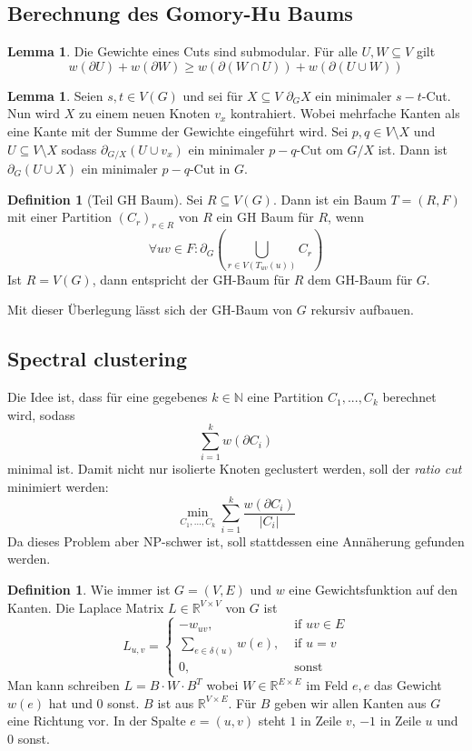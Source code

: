\documentclass[a4paper, 12pt]{article}
\theoremstyle{plain}
\theoremstyle{definition}
\newtheorem{definition}[theorem]{Definition} %
\theoremstyle{lemma}
\newtheorem{lemma}[theorem]{Lemma}
\theoremstyle{remark}
\theoremstyle{corollary}
\theoremstyle{example}
\begin{document}
	\subsection{Berechnung des Gomory-Hu Baums}
	\begin{lemma}
		Die Gewichte eines Cuts sind submodular. Für alle $U,W\subseteq V$ gilt \[w(\partial U) + w(\partial W) \geq w(\partial (W\cap U)) + w(\partial (U \cup W))\]
	\end{lemma}
	\begin{lemma}
		Seien $s,t \in V(G)$ und sei für $X\subseteq V$ $\partial_G X$ ein minimaler $s-t$-Cut. Nun wird $X$ zu einem neuen Knoten $v_x$ kontrahiert. Wobei mehrfache Kanten als eine Kante mit der Summe der Gewichte eingeführt wird. Sei $p,q \in V\setminus X$ und $U\subseteq V\setminus X$ sodass $\partial_{G/X}(U\cup v_x)$ ein minimaler $p-q$-Cut om $G/X$ ist. Dann ist $\partial_G(U\cup X)$ ein minimaler $p-q$-Cut in $G$.
	\end{lemma}
	\begin{definition}[Teil GH Baum]
		Sei $R\subseteq V(G)$. Dann ist ein Baum $T = (R,F)$ mit einer Partition $(C_r)_{r\in R}$ von $R$ ein GH Baum für $R$, wenn \[\forall uv \in F: \partial_G \left(\bigcup_{r \in V(T_{uv}(u))} C_r\right)\] Ist $R=V(G)$, dann entspricht der GH-Baum für $R$ dem GH-Baum für $G$.
	\end{definition}
	Mit dieser Überlegung lässt sich der GH-Baum von $G$ rekursiv aufbauen.
	\subsection{Spectral clustering}
	Die Idee ist, dass für eine gegebenes $k \in \mathbb{N}$ eine Partition $C_1,...,C_k$ berechnet wird, sodass \[\sum_{i=1}^{k} w(\partial C_i)\] minimal ist. Damit nicht nur isolierte Knoten geclustert werden, soll der \textit{ratio cut} minimiert werden: \[\min_{C_1,...,C_k} \sum_{i=1}^k \frac{w(\partial C_i)}{\left|C_i\right|}\] Da dieses Problem aber NP-schwer ist, soll stattdessen eine Annäherung gefunden werden.
	\begin{definition}
		Wie immer ist $G=(V,E)$ und $w$ eine Gewichtsfunktion auf den Kanten. Die Laplace Matrix $L \in \mathbb{R}^{V\times V}$ von $G$ ist \[L_{u,v} = \begin{cases}
			-w_{uv}, & \text{ if } uv \in E\\
			\sum_{e \in \delta(u)} w(e), & \text{ if } u=v\\
			0, & \text{ sonst}
		\end{cases}\]
		Man kann schreiben $L = B\cdot W \cdot B^T$ wobei $W \in \mathbb{R}^{E \times E}$ im Feld $e,e$ das Gewicht $w(e)$ hat und 0 sonst. $B$ ist aus $\mathbb{R}^{V \times E}$. Für $B$ geben wir allen Kanten aus $G$ eine Richtung vor. In der Spalte $e = (u,v)$ steht $1$ in Zeile $v$, $-1$ in Zeile $u$ und 0 sonst.
	\end{definition}
\end{document}
